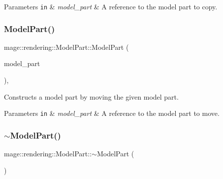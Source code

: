 \begin{DoxyParams}[1]{Parameters}
\mbox{\tt in}  & {\em model\+\_\+part} & A reference to the model part to copy. \\
\hline
\end{DoxyParams}
\hypertarget{structmage_1_1rendering_1_1_model_part_a843671f80d5c36d05d7d147f65fea890}{}\label{structmage_1_1rendering_1_1_model_part_a843671f80d5c36d05d7d147f65fea890} 
\subsubsection{\texorpdfstring{Model\+Part()}{ModelPart()}\hspace{0.1cm}{\footnotesize\ttfamily [3/3]}}
{\footnotesize\ttfamily mage\+::rendering\+::\+Model\+Part\+::\+Model\+Part (\begin{DoxyParamCaption}\item[{\hyperlink{structmage_1_1rendering_1_1_model_part}{Model\+Part} \&\&}]{model\+\_\+part }\end{DoxyParamCaption})\hspace{0.3cm}{\ttfamily [default]}, {\ttfamily [noexcept]}}

Constructs a model part by moving the given model part.


\begin{DoxyParams}[1]{Parameters}
\mbox{\tt in}  & {\em model\+\_\+part} & A reference to the model part to move. \\
\hline
\end{DoxyParams}
\hypertarget{structmage_1_1rendering_1_1_model_part_ac01c98a3cab3fb9692bebbfa6ef3fd18}{}\label{structmage_1_1rendering_1_1_model_part_ac01c98a3cab3fb9692bebbfa6ef3fd18} 
\subsubsection{\texorpdfstring{$\sim$\+Model\+Part()}{~ModelPart()}}
{\footnotesize\ttfamily mage\+::rendering\+::\+Model\+Part\+::$\sim$\+Model\+Part (\begin{DoxyParamCaption}{ }\end{DoxyParamCaption})\hspace{0.3cm}{\ttfamily [default]}}

